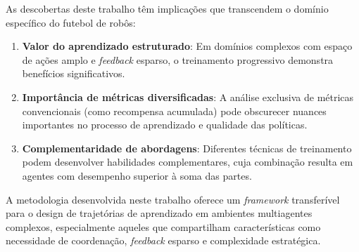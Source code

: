 As descobertas deste trabalho têm implicações que transcendem o domínio específico do futebol de robôs:

\begin{enumerate}
    \item \textbf{Valor do aprendizado estruturado}: Em domínios complexos com espaço de ações amplo e \textit{feedback} esparso, o treinamento progressivo demonstra benefícios significativos.
    
    \item \textbf{Importância de métricas diversificadas}: A análise exclusiva de métricas convencionais (como recompensa acumulada) pode obscurecer nuances importantes no processo de aprendizado e qualidade das políticas.
    
    \item \textbf{Complementaridade de abordagens}: Diferentes técnicas de treinamento podem desenvolver habilidades complementares, cuja combinação resulta em agentes com desempenho superior à soma das partes.
\end{enumerate}

A metodologia desenvolvida neste trabalho oferece um \textit{framework} transferível para o design de trajetórias de aprendizado em ambientes multiagentes complexos, especialmente aqueles que compartilham características como necessidade de coordenação, \textit{feedback} esparso e complexidade estratégica.
